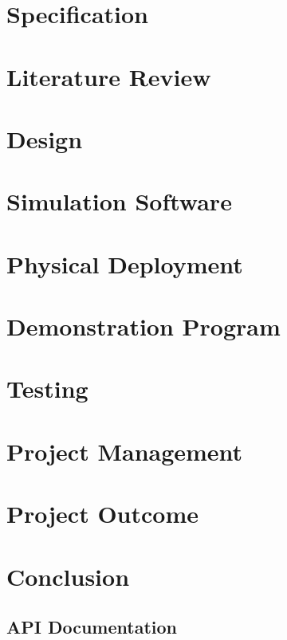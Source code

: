 \documentclass[10pt,a4paper,twoside]{report}
\begin{document}
\chapter{Specification}
	

\chapter{Literature Review}
		

\chapter{Design}
	

\chapter{Simulation Software}
	

\chapter{Physical Deployment}
	

\chapter{Demonstration Program}
	

\chapter{Testing}
	

\chapter{Project Management}
	

\chapter{Project Outcome}
	

\chapter{Conclusion}
	

\begin{appendices}
\chapter{API Documentation}




\end{appendices}
\end{document}
